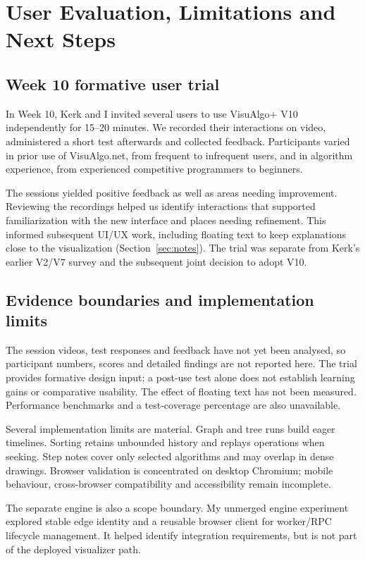 \documentclass[11pt,a4paper]{article}
\newcommand{\page}{\par\vspace{8pt}}
\begin{document}
\page
\section{User Evaluation, Limitations and Next Steps}
\subsection{Week 10 formative user trial}
In Week 10, Kerk and I invited several users to use VisuAlgo+ V10 independently for 15--20 minutes. We recorded their interactions on video, administered a short test afterwards and collected feedback. Participants varied in prior use of VisuAlgo.net, from frequent to infrequent users, and in algorithm experience, from experienced competitive programmers to beginners.

The sessions yielded positive feedback as well as areas needing improvement. Reviewing the recordings helped us identify interactions that supported familiarization with the new interface and places needing refinement. This informed subsequent UI/UX work, including floating text to keep explanations close to the visualization (Section~\ref{sec:notes}). The trial was separate from Kerk's earlier V2/V7 survey and the subsequent joint decision to adopt V10.

\subsection{Evidence boundaries and implementation limits}
The session videos, test responses and feedback have not yet been analysed, so participant numbers, scores and detailed findings are not reported here. The trial provides formative design input; a post-use test alone does not establish learning gains or comparative usability. The effect of floating text has not been measured. Performance benchmarks and a test-coverage percentage are also unavailable.

Several implementation limits are material. Graph and tree runs build eager timelines. Sorting retains unbounded history and replays operations when seeking. Step notes cover only selected algorithms and may overlap in dense drawings. Browser validation is concentrated on desktop Chromium; mobile behaviour, cross-browser compatibility and accessibility remain incomplete.

The separate engine is also a scope boundary. My unmerged engine experiment explored stable edge identity and a reusable browser client for worker/RPC lifecycle management. It helped identify integration requirements, but is not part of the deployed visualizer path.
\end{document}
